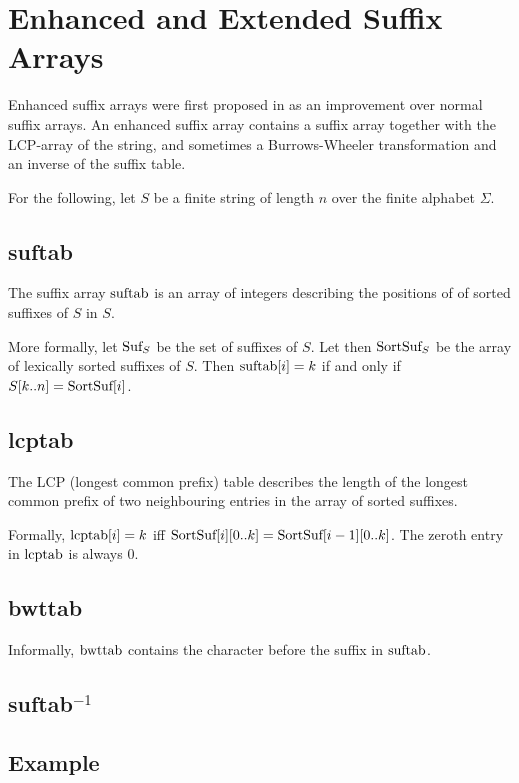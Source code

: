 \documentclass[a4paper,10pt]{article}
\begin{document}
\section*{Enhanced and Extended Suffix Arrays}

Enhanced suffix arrays were first proposed in
\citealt{abouelhoda2002enhanced} as an improvement over normal suffix
arrays. An enhanced suffix array contains a suffix array together with the
LCP-array of the string, and sometimes a Burrows-Wheeler transformation
and an inverse of the suffix table.

For the following, let $S$ be a finite string of length $n$ over the
finite alphabet $\Sigma$.

\subsection*{suftab}

The suffix array $\hbox{suftab}$ is an array of integers describing the
positions of of sorted suffixes of $S$ in $S$.

More formally, let $\hbox{Suf}_{S}$ be the set of suffixes of $S$. Let
then $\hbox{SortSuf}_{S}$ be the array of lexically sorted suffixes of
$S$. Then $\hbox{suftab}[i]=k$ if and only if $S[k..n]=\hbox{SortSuf}[i]$.

\subsection*{lcptab}

The LCP (longest common prefix) table describes the length of the longest
common prefix of two neighbouring entries in the array of sorted suffixes.

Formally, $\hbox{lcptab}[i]=k$ iff
$\hbox{SortSuf}[i][0..k]=\hbox{SortSuf}[i-1][0..k]$. The zeroth entry
in $\hbox{lcptab}$ is always $0$.

\subsection*{bwttab}

Informally, $\hbox{bwttab}$ contains the character before the suffix
in $\hbox{suftab}$.

\subsection*{suftab$^{-1}$}

\subsection*{Example}
\end{document}
